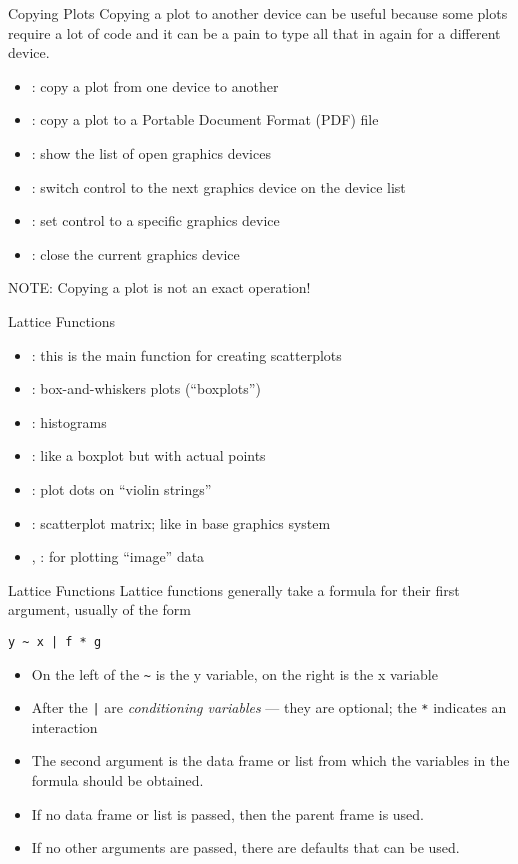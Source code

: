 \documentclass[aspectratio=169]{beamer}
\begin{document}
\begin{frame}{Copying Plots}
Copying a plot to another device can be useful because some plots
require a lot of code and it can be a pain to type all that in again
for a different device.
\begin{itemize}
\item {}: copy a plot from one device to another
\item {}: copy a plot to a Portable Document Format
  (PDF) file
\item {}: show the list of open graphics devices
\item {}: switch control to the next graphics device on
  the device list
\item {}: set control to a specific graphics device
\item {}: close the current graphics device
\end{itemize}
NOTE: Copying a plot is not an exact operation!
\end{frame}


\begin{frame}{Lattice Functions}
\begin{itemize}
\item
{}: this is the main function for creating scatterplots
\item
{}: box-and-whiskers plots (``boxplots'')
\item
{}: histograms
\item
{}: like a boxplot but with actual points
\item
{}: plot dots on ``violin strings''
\item
{}: scatterplot matrix; like  in base graphics
system
\item
{}, : for plotting ``image'' data
\end{itemize}
\end{frame}


\begin{frame}[fragile]{Lattice Functions}
Lattice functions generally take a formula for their first argument,
usually of the form
\begin{verbatim}
y ~ x | f * g
\end{verbatim}
\begin{itemize}
\item
On the left of the \verb+~+ is the y variable, on the right is the x
variable
\item
After the \verb+|+ are \textit{conditioning variables} --- they are
optional; the \verb+*+ indicates an interaction
\item
The second argument is the data frame or list from which the variables
in the formula should be obtained.
\item
If no data frame or list is passed, then the parent frame is used.
\item
If no other arguments are passed, there are defaults that can be used.
\end{itemize}
\end{frame}
\end{document}
